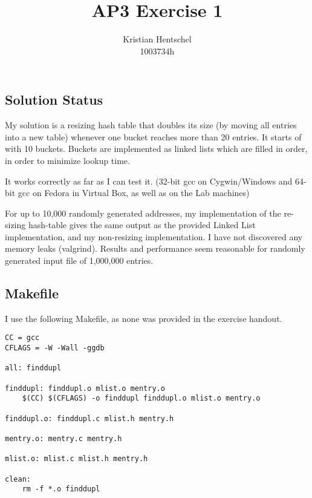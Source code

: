 \documentclass{article}
\title{AP3 Exercise 1}
\author{Kristian Hentschel\\1003734h}
\begin{document}
\maketitle

\subsection{Solution Status}
My solution is a resizing hash table that doubles its size (by moving all entries into a new table) whenever one bucket reaches more than 20 entries. It starts of with 10 buckets. Buckets are implemented as linked lists which are filled in order, in order to minimize lookup time.

It works correctly as far as I can test it. (32-bit gcc on Cygwin/Windows and 64-bit gcc on Fedora in Virtual Box, as well as on the Lab machines)

For up to 10,000 randomly generated addresses, my implementation of the re-sizing hash-table gives the same output as the provided Linked List implementation, and my non-resizing implementation. I have not discovered any memory leaks (valgrind). Results and performance seem reasonable for randomly generated input file of 1,000,000 entries.

\subsection{Makefile}
I use the following Makefile, as none was provided in the exercise handout.

\begin{lstlisting}
CC = gcc
CFLAGS = -W -Wall -ggdb

all: finddupl

finddupl: finddupl.o mlist.o mentry.o
	$(CC) $(CFLAGS) -o finddupl finddupl.o mlist.o mentry.o

finddupl.o: finddupl.c mlist.h mentry.h

mentry.o: mentry.c mentry.h

mlist.o: mlist.c mlist.h mentry.h

clean:
	rm -f *.o finddupl
\end{lstlisting}
\end{document}
